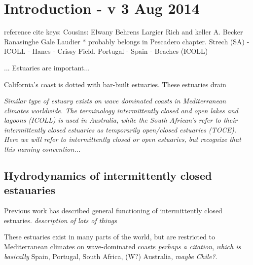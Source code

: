 \chapter{Introduction - v 3 Aug 2014}
\label{chIntro}

reference cite keys:
Cousins: \cite{cousins_effects_2010,cousins_hydrodynamics_2011}
Elwany \cite{elwany_opening_1998}
Behrens \cite{behrens_characterization_2009,behrens_episodic_2013}
Largier \cite{largier_structure_1986,slinger_evolution_1990,largier_circulation_1991,largier_dynamics_1991,largier_stratified_1992,largier_tidal_1992,largier_seasonally_1997}
Rich and keller \cite{rich_hydrologic_2013}
A. Becker \cite{becker_artificial_2009}
Ranasinghe \cite{ranasinghe_flushing_1998,ranasinghe_circulation_1999,ranasinghe_morphodynamic_1999,ranasinghe_seasonal_2003}
Gale \cite{gale_vertical_2006,gale_processes_2007}
Laudier \cite{laudier_measured_2011} * probably belongs in Pescadero chapter.
Strech (SA) - \cite{stretch_breaching_2006,parkinson_breaching_2007}
ICOLL - \cite{haines_morphometric_2006,baldock_morphodynamic_2008,davidson_simple_2009}
Hanes - Crissy Field. \cite{hanes_waves_2011}
Portugal - \cite{fortunato_morphological_2014}
Spain - \cite{moreno_morphodynamics_2010}
\cite{uncles_infragravity_2014}
Beaches (ICOLL)  \cite{weir_beach_2006}

... Estuaries are important... 


California's coast is dotted with bar-built estuaries.  These estuaries drain 


\emph{Similar type of estuary exists on wave dominated coasts in Mediterranean climates worldwide. The terminology intermittently closed and open lakes and lagoons (ICOLL) is used in Australia, while the South African's refer to their intermittently closed estuaries as temporarily open/closed estuaries (TOCE).  Here we will refer to intermittently closed or open estuaries, but recognize that this naming convention... }

\section{Hydrodynamics of intermittently closed estauaries}
Previous work has described general functioning of intermittently closed estuaries.  
\emph{description of lots of things}

These estuaries exist in many parts of the world, but are restricted to Mediterranean climates on wave-dominated coasts \emph{perhaps a citation}, \emph{which is basically} Spain, Portugal, South Africa, (W?) Australia, \emph{maybe Chile?}. 

